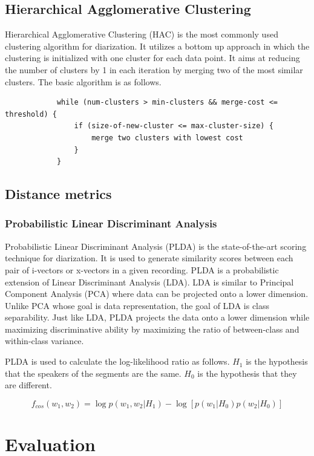 	\subsection{Hierarchical Agglomerative Clustering}
		 Hierarchical Agglomerative Clustering (HAC) is the most commonly used clustering algorithm for diarization. It utilizes a bottom up approach in which the clustering is initialized with one cluster for each data point. It aims at reducing the number of clusters by 1 in each iteration by merging two of the most similar clusters. The basic algorithm is as follows.
		
		\begin{verbatim}
			while (num-clusters > min-clusters && merge-cost <= threshold) {
			    if (size-of-new-cluster <= max-cluster-size) {
			        merge two clusters with lowest cost
			    }
			}
		\end{verbatim}

	\subsection{Distance metrics}
		\subsubsection{Probabilistic Linear Discriminant Analysis}
		Probabilistic Linear Discriminant Analysis (PLDA) \cite{ioffe2006probabilistic} \cite{prince2007probabilistic} is the state-of-the-art scoring technique for diarization. It is used to generate similarity scores between each pair of i-vectors or x-vectors in a given recording. PLDA is a probabilistic extension of Linear Discriminant Analysis (LDA). LDA is similar to Principal Component Analysis (PCA) where data can be projected onto a lower dimension. Unlike PCA whose goal is data representation, the goal of LDA is class separability. Just like LDA, PLDA projects the data onto a lower dimension while maximizing discriminative ability by maximizing the ratio of between-class and within-class variance.
		
		PLDA is used to calculate the log-likelihood ratio as follows. $H_1$ is the hypothesis that the speakers of the segments are the same. $H_0$ is the hypothesis that they are different.
		
		$$ f_{cos}(w_1,w_2) =  \log p(w_1, w_2 | H_1) - \log [ p(w_1|H_0)  p(w_2|H_0) ] $$

\section{Evaluation}

